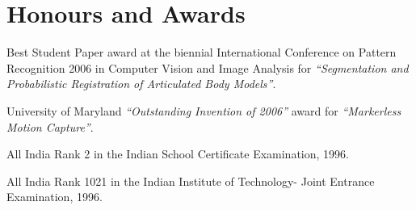 \documentclass[letterpaper]{article}
\begin{document}
\section*{Honours and Awards}
\begin{list1}
  \item
	\begin{list2}
	  \item Best Student Paper award at the biennial International Conference on
		Pattern Recognition 2006 in Computer Vision and Image Analysis for 
		\emph{``Segmentation and Probabilistic Registration of
		Articulated Body Models''}.
	  \item University of Maryland \emph{``Outstanding Invention of 2006''}
		award for \emph{``Markerless Motion Capture''}.
	  \item All India Rank 2 in the Indian School Certificate
		Examination, 1996.
	  \item All India Rank 1021 in the Indian Institute of Technology- Joint
		Entrance Examination, 1996.

	\end{list2}
\end{list1}
\end{document}

